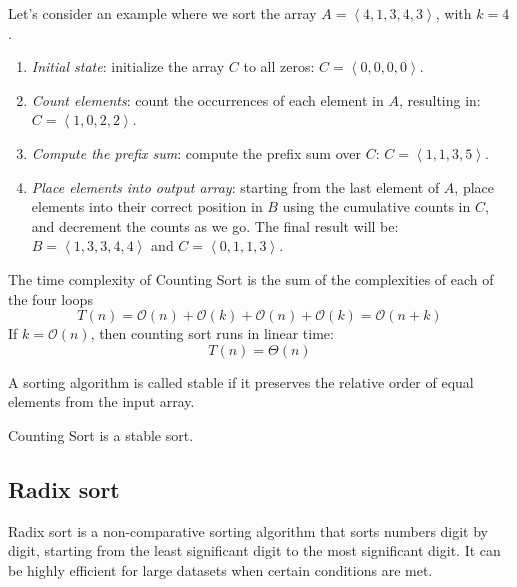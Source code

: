 \begin{example}
    Let's consider an example where we sort the array $A=\left\langle 4, 1, 3, 4, 3\right\rangle$, with $k=4$. 
    \begin{enumerate}
        \item \textit{Initial state}: initialize the array $C$ to all zeros: $C=\left\langle 0,0,0,0\right\rangle$.
        \item \textit{Count elements}: count the occurrences of each element in $A$, resulting in: $C=\left\langle 1,0,2,2\right\rangle$.
        \item \textit{Compute the prefix sum}: compute the prefix sum over $C$: $C=\left\langle 1,1,3,5\right\rangle$.
        \item \textit{Place elements into output array}: starting from the last element of $A$, place elements into their correct position in $B$ using the cumulative counts in $C$, and decrement the counts as we go. 
            The final result will be: $B=\left\langle 1,3,3,4,4\right\rangle$ and $C=\left\langle 0,1,1,3\right\rangle$.
    \end{enumerate}
\end{example}
The time complexity of Counting Sort is the sum of the complexities of each of the four loops
\[T(n)=\mathcal{O}(n)+\mathcal{O}(k)+\mathcal{O}(n)+\mathcal{O}(k)=\mathcal{O}(n+k)\]
If $k = \mathcal{O}(n)$, then counting sort runs in linear time: 
\[T(n)=\Theta(n)\]
\begin{definition}
    A sorting algorithm is called stable if it preserves the relative order of equal elements from the input array.
\end{definition}
\begin{property}
    Counting Sort is a stable sort.
\end{property}





























\subsection{Radix sort}
Radix sort is a non-comparative sorting algorithm that sorts numbers digit by digit, starting from the least significant digit to the most significant digit. 
It can be highly efficient for large datasets when certain conditions are met.

